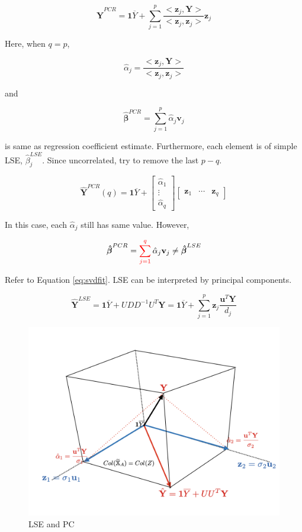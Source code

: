 \documentclass[]{book}
\theoremstyle{definition}
\theoremstyle{definition}
\theoremstyle{definition}
\theoremstyle{remark}
\begin{document}
\begin{equation}
  \hat{\mathbf{Y}}^{PCR} = \mathbf{1} \overline{Y} + \sum_{j = 1}^p \frac{< \mathbf{z}_j, \mathbf{Y} >}{< \mathbf{z}_j, \mathbf{z}_j >} \mathbf{z}_j
  \label{eq:pcrsimple}
\end{equation}

Here, when \(q = p\),

\[\hat\alpha_j = \frac{< \mathbf{z}_j, \mathbf{Y} >}{< \mathbf{z}_j, \mathbf{z}_j >}\]

and

\[\boldsymbol{\hat\beta}^{PCR} = \sum_{j = 1}^p \hat\alpha_j \mathbf{v}_j\]

is same as regression coefficient estimate. Furthermore, each element is of simple LSE, \(\hat\beta_j^{LSE}\). Since uncorrelated, try to remove the last \(p - q\).

\[
\hat{\mathbf{Y}}^{PCR}(q) = \mathbf{1} \overline{Y} + \begin{bmatrix}
  \hat\alpha_1 \\
  \vdots \\
  \hat\alpha_q
\end{bmatrix} \begin{bmatrix}
  \mathbf{z}_1 & \cdots & \mathbf{z}_q
\end{bmatrix}
\]

In this case, each \(\hat\alpha_j\) still has same value. However,

\[\boldsymbol{\hat\beta}^{PCR} = \sum_{j = 1}^{\color{red}{q}} \hat\alpha_j \mathbf{v}_j \neq \boldsymbol{\hat\beta}^{LSE}\]

Refer to Equation \eqref{eq:svdfit}. LSE can be interpreted by principal components.

\[\hat{\mathbf{Y}}^{LSE} = \mathbf{1} \overline{Y} + UDD^{-1} U^T \mathbf{Y} = \mathbf{1} \overline{Y} + \sum_{j = 1}^p \mathbf{z}_j \frac{\mathbf{u}^T \mathbf{Y}}{d_j}\]

\begin{figure}[H]

{\centering \includegraphics[width=0.7\linewidth]{images/pcrlse} 

}

\caption{LSE and PC}\label{fig:lsepc}
\end{figure}
\end{document}
